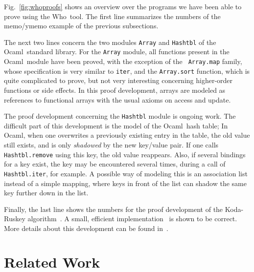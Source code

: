 \documentclass[a4paper]{llncs}
\newcommand{\who}{Who}
\newcommand{\ocaml}{Ocaml}
\begin{document}
Fig.~\ref{fig:whoproofs} shows an overview over the programs we have been able
to prove using the \who\ tool. The first line summarizes the numbers of the
memo/ymemo example of the previous subsections. 

The next two lines concern the two modules {\tt Array} and {\tt Hashtbl} of
the \ocaml\ standard library. For the {\tt Array} module, all functions
present in the \ocaml\ module have been proved, with the exception of the {\tt
Array.map} family, whose specification is very similar to {\tt iter}, and the
{\tt Array.sort} function, which is quite complicated to prove, but not very
interesting concerning higher-order functions or side effects. In this proof
development, arrays are modeled as references to functional arrays with the
usual axioms on access and update.

The proof development concerning the {\tt Hashtbl} module is ongoing work. The
difficult part of this development is the model of the \ocaml\ hash table; In
\ocaml, when one overwrites a previously existing entry in the table, the old
value still exists, and is only {\em shadowed} by the new key/value pair. If
one calls {\tt Hashtbl.remove} using this key, the old value reappears. Also,
if several bindings for a key exist, the key may be encountered several times,
during a call of {\tt Hashtbl.iter}, for example. A possible way of modeling
this is an association list instead of a simple mapping, where keys in front
of the list can shadow the same key further down in the list. 

Finally, the last line shows the numbers for the proof development of the
Koda-Ruskey algorithm~\cite{KodaRuskey93}. A small, efficient
implementation~\cite{FilliatrePottier02} is shown to be correct. More details
about this development can be found in~\cite{KanigFilliatre09wml}.

\section{Related Work}
\label{sec:related}
\end{document}
